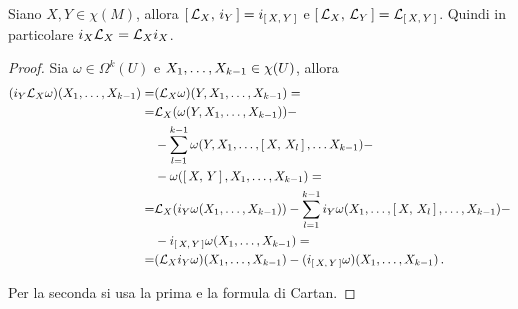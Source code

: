 \begin{corollary}
	Siano $X,Y\in\chi(M)$, allora $\comm{\Lie_X}{i_Y} = i_{\comm XY}$ e $\comm{\Lie_X}{\Lie_Y} = \Lie_{\comm XY}$.
	Quindi in particolare $i_X\Lie_X = \Lie_X i_X$.
\end{corollary}
\begin{proof}
	Sia $\omega \in \Omega^k(U)$ e $\seqb X{k-1}, \in \chi(U)$, allora
	\begin{align*}
		(i_Y\Lie_X\omega)(\seqb X{k-1},) =& (\Lie_X\omega)(Y,\seqb X{k-1},) =\\
		=&\Lie_X(\omega(Y,\seqb X{k-1},)) -\\
		&-\sum_{l=1}^{k-1}\omega(Y,X_1,\ldots,\comm{X}{X_l},\ldots X_{k-1}) -\\
		&-\omega (\comm XY, \seqb X{k-1},)=\\
		=& \Lie_X(i_Y\omega(\seqb X{k-1},)) -\sum_{l=1}^{k-1} i_Y\omega(X_1,\ldots, \comm X{X_l}, \ldots, X_{k-1}) -\\
		&-i_{\comm XY} \omega (\seqb X{k-1},) =\\
		=& (\Lie_X i_Y\omega)(\seqb X{k-1},) - (i_{\comm XY}\omega)(\seqb X{k-1},) \punto
	\end{align*}

	Per la seconda si usa la prima e la formula di Cartan.
\end{proof}




































